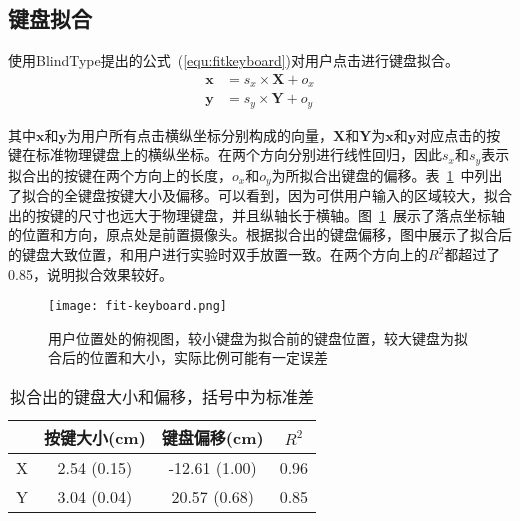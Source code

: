 \subsection{键盘拟合}
使用BlindType\cite{2017blindtype}提出的公式~(\ref{equ:fitkeyboard})对用户点击进行键盘拟合。
\begin{equation}
  \label{equ:fitkeyboard}
  \begin{aligned}
  \textbf{x} &= s_{x} \times \textbf{X} + o_{x} \\
  \textbf{y} &= s_{y} \times \textbf{Y} + o_{y}
  \end{aligned}
\end{equation}

其中$\textbf{x}$和$\textbf{y}$为用户所有点击横纵坐标分别构成的向量，$\textbf{X}$和$\textbf{Y}$为$\textbf{x}$和$\textbf{y}$对应点击的按键在标准物理键盘上的横纵坐标。在两个方向分别进行线性回归，因此$s_{x}$和$s_{y}$表示拟合出的按键在两个方向上的长度，$o_{x}$和$o_{y}$为所拟合出键盘的偏移。表~\ref{tab:fitkeyboard}~中列出了拟合的全键盘按键大小及偏移。可以看到，因为可供用户输入的区域较大，拟合出的按键的尺寸也远大于物理键盘，并且纵轴长于横轴。图~\ref{fig:fitkeyboard}~展示了落点坐标轴的位置和方向，原点处是前置摄像头。根据拟合出的键盘偏移，图中展示了拟合后的键盘大致位置，和用户进行实验时双手放置一致。在两个方向上的$R^{2}$都超过了0.85，说明拟合效果较好。

\begin{figure}[h] %
  \centering
  \texttt{[image: fit-keyboard.png]}
  \caption{用户位置处的俯视图，较小键盘为拟合前的键盘位置，较大键盘为拟合后的位置和大小，实际比例可能有一定误差}
  \label{fig:fitkeyboard}
\end{figure}

\begin{table}[htb]
  \centering
  \begin{minipage}[t]{0.55\linewidth} %
  \caption[拟合出的键盘参数]{拟合出的键盘大小和偏移，括号中为标准差}
  \label{tab:fitkeyboard}
    \centering
    \begin{tabularx}{\linewidth}{cccc}
      \toprule[1.5pt]
      & 按键大小(cm) & 键盘偏移(cm) & $R^{2}$ \\\midrule[1pt]
      X & 2.54 (0.15) & -12.61 (1.00) & 0.96 \\
      Y & 3.04 (0.04) & 20.57 (0.68) & 0.85\\
      \bottomrule[1.5pt]
    \end{tabularx}
  \end{minipage}
\end{table}

